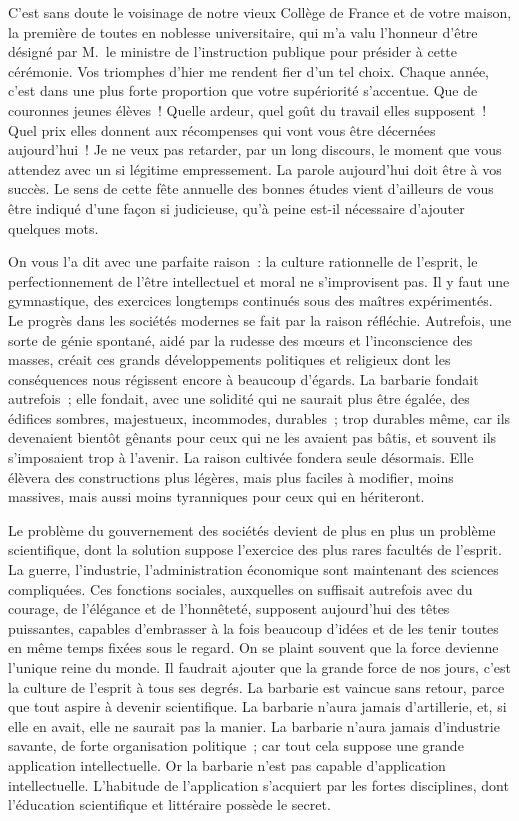 \documentclass[french,twoside]{book} %
\newcommand\orgName[1]{#1}
\newcommand\persName[1]{#1}
\newcommand{\salute}[1]{\bigbreak{#1}\par\medbreak}
\begin{document}
\salute{Jeunes Élèves,}
\noindent C’est sans doute le voisinage de notre vieux {\orgName Collège de France} et de votre maison, la première de toutes en noblesse universitaire, qui m’a valu l’honneur d’être désigné par {\persName M. le ministre de l’instruction publique} pour présider à cette cérémonie. Vos triomphes d’hier me rendent fier d’un tel choix. Chaque année, c’est dans une plus forte proportion que votre supériorité s’accentue. Que de couronnes jeunes élèves ! Quelle ardeur, quel goût du travail elles supposent ! Quel prix elles donnent aux récompenses qui vont vous être décernées aujourd’hui ! Je ne veux pas retarder, par un long discours, le moment que vous attendez avec un si légitime empressement. La parole aujourd’hui doit être à vos succès. Le sens de cette fête annuelle des bonnes études vient d’ailleurs de vous être indiqué d’une façon si judicieuse, qu’à peine est-il nécessaire d’ajouter quelques mots.\par
On vous l’a dit avec une parfaite raison : la culture rationnelle de l’esprit, le perfectionnement de l’être intellectuel et moral ne s’improvisent pas. Il y faut une gymnastique, des exercices longtemps continués sous des maîtres expérimentés. Le progrès dans les sociétés modernes se fait par la raison réfléchie. Autrefois, une sorte de génie spontané, aidé par la rudesse des mœurs et l’inconscience des masses, créait ces grands développements politiques et religieux dont les conséquences nous régissent encore à beaucoup d’égards. La barbarie fondait autrefois ; elle fondait, avec une solidité qui ne saurait plus être égalée, des édifices sombres, majestueux, incommodes, durables ; trop durables même, car ils devenaient bientôt gênants pour ceux qui ne les avaient pas bâtis, et souvent ils s’imposaient trop à l’avenir. La raison cultivée fondera seule désormais. Elle élèvera des constructions plus légères, mais plus faciles à modifier, moins massives, mais aussi moins tyranniques pour ceux qui en hériteront.\par
Le problème du gouvernement des sociétés devient de plus en plus un problème scientifique, dont la solution suppose l’exercice des plus rares facultés de l’esprit. La guerre, l’industrie, l’administration économique sont maintenant des sciences compliquées. Ces fonctions sociales, auxquelles on suffisait autrefois avec du courage, de l’élégance et de l’honnêteté, supposent aujourd’hui des têtes puissantes, capables d’embrasser à la fois beaucoup d’idées et de les tenir toutes en même temps fixées sous le regard. On se plaint souvent que la force devienne l’unique reine du monde. Il faudrait ajouter que la grande force de nos jours, c’est la culture de l’esprit à tous ses degrés. La barbarie est vaincue sans retour, parce que tout aspire à devenir scientifique. La barbarie n’aura jamais d’artillerie, et, si elle en avait, elle ne saurait pas la manier. La barbarie n’aura jamais d’industrie savante, de forte organisation politique ; car tout cela suppose une grande application intellectuelle. Or la barbarie n’est pas capable d’application intellectuelle. L’habitude de l’application s’acquiert par les fortes disciplines, dont l’éducation scientifique et littéraire possède le secret.\par
\end{document}
